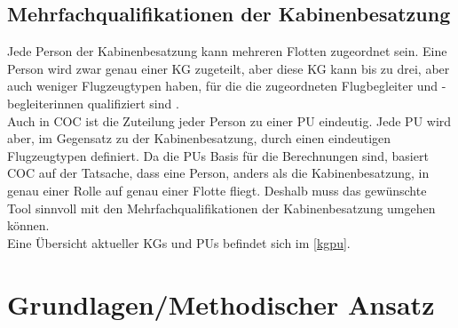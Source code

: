 \documentclass [12pt, a4paper, oneside, titlepage, ngerman]{article}
\begin{document}
\subsection{Mehrfachqualifikationen der Kabinenbesatzung}
Jede Person der Kabinenbesatzung kann mehreren Flotten zugeordnet sein. Eine Person wird zwar genau einer \ac{KG} zugeteilt, aber diese \ac{KG} kann bis zu drei, aber auch weniger Flugzeugtypen haben, für die die zugeordneten Flugbegleiter und -begleiterinnen qualifiziert sind \cite[vgl.][]{Gespraech2}. \\
Auch in \ac {COC} ist die Zuteilung jeder Person zu einer \ac{PU} eindeutig. Jede \ac{PU} wird aber, im Gegensatz zu der Kabinenbesatzung, durch einen eindeutigen Flugzeugtypen definiert. Da die \acp{PU} Basis für die Berechnungen sind, basiert \ac{COC} auf der Tatsache, dass eine Person, anders als die Kabinenbesatzung, in genau einer Rolle auf genau einer Flotte fliegt. Deshalb muss das gewünschte Tool sinnvoll mit den Mehrfachqualifikationen der Kabinenbesatzung umgehen können. \\
Eine Übersicht aktueller \acp{KG} und \acp{PU} befindet sich im \autoref{kgpu}.

\newpage

\section {Grundlagen/Methodischer Ansatz}
\end{document}
